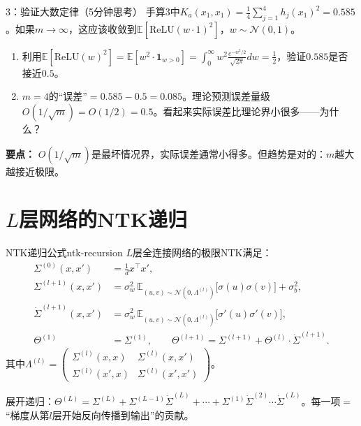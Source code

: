 \documentclass[11pt,a4paper]{article}
\newcommand{\E}{\mathbb{E}}
\newcommand{\cN}{\mathcal{N}}
\begin{document}
\begin{classexercise}{3：验证大数定律（5分钟思考）}
手算3中$K_a(x_1,x_1) = \frac{1}{4}\sum_{j=1}^4 h_j(x_1)^2 = 0.585$。如果$m\to\infty$，这应该收敛到$\E[\text{ReLU}(w\cdot 1)^2]$，$w\sim\cN(0,1)$。
\begin{enumerate}[label=(\alph*)]
\item 利用$\E[\text{ReLU}(w)^2] = \E[w^2\cdot\mathbf{1}_{w>0}] = \int_0^\infty w^2\frac{e^{-w^2/2}}{\sqrt{2\pi}}dw = \frac{1}{2}$，验证$0.585$是否接近$0.5$。
\item $m=4$的``误差''$=0.585-0.5=0.085$。理论预测误差量级$O(1/\sqrt{m})=O(1/2)=0.5$。看起来实际误差比理论界小很多——为什么？
\end{enumerate}

\textbf{要点：} $O(1/\sqrt{m})$是最坏情况界，实际误差通常小得多。但趋势是对的：$m$越大越接近极限。
\end{classexercise}

\section{$L$层网络的NTK递归}

\begin{theorem}{NTK递归公式}{ntk-recursion}
$L$层全连接网络的极限NTK满足：
\begin{align}
\Sigma^{(0)}(x,x') &= \frac{1}{d}x^\top x', \\
\Sigma^{(l+1)}(x,x') &= \sigma_w^2\,\E_{(u,v)\sim\cN(0,\Lambda^{(l)})}\big[\sigma(u)\sigma(v)\big] + \sigma_b^2, \\
\dot\Sigma^{(l+1)}(x,x') &= \sigma_w^2\,\E_{(u,v)\sim\cN(0,\Lambda^{(l)})}\big[\sigma'(u)\sigma'(v)\big], \\
\Theta^{(1)} &= \Sigma^{(1)}, \qquad \Theta^{(l+1)} = \Sigma^{(l+1)} + \Theta^{(l)}\cdot\dot\Sigma^{(l+1)}.
\end{align}
其中$\Lambda^{(l)} = \begin{pmatrix}\Sigma^{(l)}(x,x) & \Sigma^{(l)}(x,x') \\ \Sigma^{(l)}(x',x) & \Sigma^{(l)}(x',x')\end{pmatrix}$。
\end{theorem}

展开递归：$\Theta^{(L)} = \Sigma^{(L)} + \Sigma^{(L-1)}\dot\Sigma^{(L)} + \cdots + \Sigma^{(1)}\dot\Sigma^{(2)}\cdots\dot\Sigma^{(L)}$。每一项$=$``梯度从第$l$层开始反向传播到输出''的贡献。
\end{document}
